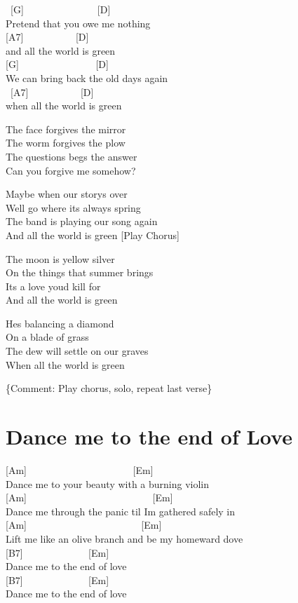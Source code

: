 \documentclass[
  letterpaper,
  twoside=false]{scrbook}
\begin{document}
~{[}G{]} ~ ~ ~ ~ ~ ~ ~ ~ ~{[}D{]}\\
Pretend that you owe me nothing ~ ~ ~\\
\hspace*{0.333em} {[}A7{]} ~ ~ ~ ~ ~ ~ {[}D{]}\\
and all the world is green\\
{[}G{]} ~ ~ ~ ~ ~ ~ ~ ~ ~ {[}D{]} ~ ~ ~ ~\\
We can bring back the old days again ~ ~\\
\hspace*{0.333em} ~{[}A7{]} ~ ~ ~ ~ ~ ~ {[}D{]}\\
when all the world is green

The face forgives the mirror\\
The worm forgives the plow\\
The questions begs the answer\\
Can you forgive me somehow?

Maybe when our story\textquotesingle s over\\
We\textquotesingle ll go where it\textquotesingle s always spring\\
The band is playing our song again\\
And all the world is green {[}Play Chorus{]}

The moon is yellow silver\\
On the things that summer brings\\
It\textquotesingle s a love you\textquotesingle d kill for\\
And all the world is green

He\textquotesingle s balancing a diamond\\
On a blade of grass\\
The dew will settle on our graves\\
When all the world is green

\{Comment: Play chorus, solo, repeat last verse\}

\hypertarget{dance-me-to-the-end-of-love}{%
\chapter{Dance me to the end of
Love}\label{dance-me-to-the-end-of-love}}

{[}Am{]} ~ ~ ~ ~ ~ ~ ~ ~ ~ ~ ~ ~ ~{[}Em{]}\\
Dance me to your beauty with a burning violin\\
{[}Am{]} ~ ~ ~ ~ ~ ~ ~ ~ ~ ~ ~ ~ ~ ~ ~ {[}Em{]}\\
Dance me through the panic \textquotesingle til I\textquotesingle m
gathered safely in\\
{[}Am{]} ~ ~ ~ ~ ~ ~ ~ ~ ~ ~ ~ ~ ~ ~{[}Em{]}\\
Lift me like an olive branch and be my homeward dove\\
{[}B7{]} ~ ~ ~ ~ ~ ~ ~ ~{[}Em{]}\\
Dance me to the end of love\\
{[}B7{]} ~ ~ ~ ~ ~ ~ ~ ~{[}Em{]}\\
Dance me to the end of love
\end{document}

